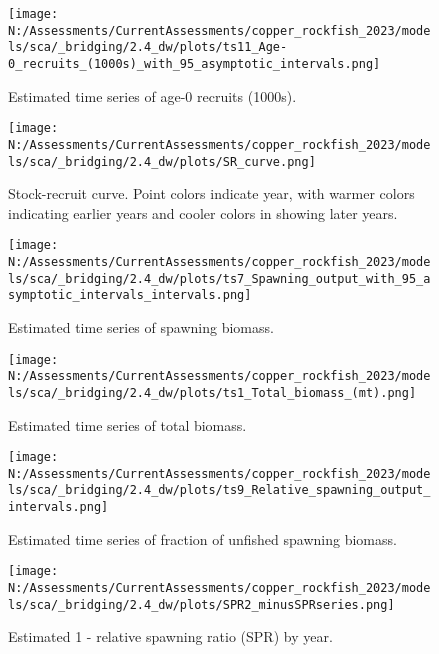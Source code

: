 \documentclass[11pt,
  english,
  letterpaper,
]{article}
\begin{document}
\begin{figure}
\centering
\texttt{[image: N:/Assessments/CurrentAssessments/copper\_rockfish\_2023/models/sca/\_bridging/2.4\_dw/plots/ts11\_Age-0\_recruits\_(1000s)\_with\_95\_asymptotic\_intervals.png]}
\caption{Estimated time series of age-0 recruits (1000s).\label{fig:recruits}}
\end{figure}

\begin{figure}
\centering
\texttt{[image: N:/Assessments/CurrentAssessments/copper\_rockfish\_2023/models/sca/\_bridging/2.4\_dw/plots/SR\_curve.png]}
\caption{Stock-recruit curve. Point colors indicate year, with warmer colors indicating earlier years and cooler colors in showing later years.\label{fig:bh-curve}}
\end{figure}

\begin{figure}
\centering
\texttt{[image: N:/Assessments/CurrentAssessments/copper\_rockfish\_2023/models/sca/\_bridging/2.4\_dw/plots/ts7\_Spawning\_output\_with\_95\_asymptotic\_intervals\_intervals.png]}
\caption{Estimated time series of spawning biomass.\label{fig:ssb}}
\end{figure}

\begin{figure}
\centering
\texttt{[image: N:/Assessments/CurrentAssessments/copper\_rockfish\_2023/models/sca/\_bridging/2.4\_dw/plots/ts1\_Total\_biomass\_(mt).png]}
\caption{Estimated time series of total biomass.\label{fig:tot-bio}}
\end{figure}

\begin{figure}
\centering
\texttt{[image: N:/Assessments/CurrentAssessments/copper\_rockfish\_2023/models/sca/\_bridging/2.4\_dw/plots/ts9\_Relative\_spawning\_output\_intervals.png]}
\caption{Estimated time series of fraction of unfished spawning biomass.\label{fig:depl}}
\end{figure}

\begin{figure}
\centering
\texttt{[image: N:/Assessments/CurrentAssessments/copper\_rockfish\_2023/models/sca/\_bridging/2.4\_dw/plots/SPR2\_minusSPRseries.png]}
\caption{Estimated 1 - relative spawning ratio (SPR) by year.\label{fig:1-spr}}
\end{figure}
\end{document}
